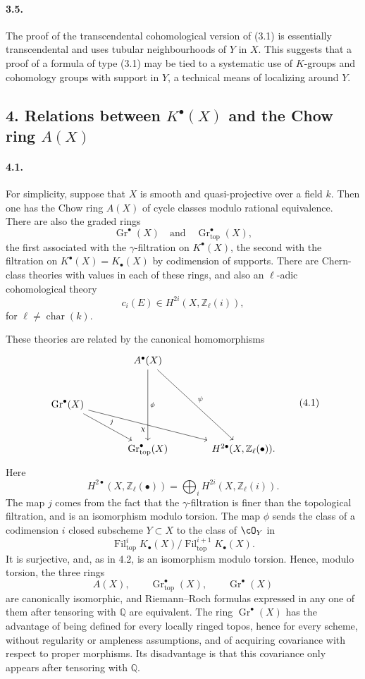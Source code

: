 \documentclass[11pt]{article}
\theoremstyle{plain}
\theoremstyle{definition}
\theoremstyle{remark}
\newcommand{\QQ}{\mathbb Q}
\newcommand{\ZZ}{\mathbb Z}
\DeclareMathOperator{\Gr}{Gr}
\providecommand{\Fil}{\operatorname{Fil}}
\providecommand{\car}{\operatorname{char}}
\providecommand{\topf}{\mathrm{top}}
\begin{document}
\paragraph{3.5.}
The proof of the transcendental cohomological version of (3.1) is essentially transcendental and uses tubular neighbourhoods of $Y$ in $X$. This suggests that a proof of a formula of type (3.1) may be tied to a systematic use of $K$-groups and cohomology groups with support in $Y$, a technical means of localizing around $Y$.

\subsection*{4. Relations between $K^\bullet(X)$ and the Chow ring $A(X)$}

\paragraph{4.1.}
For simplicity, suppose that $X$ is smooth and quasi-projective over a field $k$. Then one has the Chow ring $A(X)$ of cycle classes modulo rational equivalence. There are also the graded rings
\[
\Gr^\bullet(X)
\quad\text{and}\quad
\Gr^\bullet_{\topf}(X),
\]
the first associated with the $\gamma$-filtration on $K^\bullet(X)$, the second with the filtration on $K^\bullet(X)=K_\bullet(X)$ by codimension of supports. There are Chern-class theories with values in each of these rings, and also an $\ell$-adic cohomological theory
\[
c_i(E)\in H^{2i}(X,\ZZ_\ell(i)),
\]
for $\ell\neq\car(k)$.

These theories are related by the canonical homomorphisms
\[
\begin{tikzcd}[column sep=large,row sep=large]
& A^\bullet(X)\arrow[dd,"\phi"]\arrow[rdd,"\psi"] &\\
\Gr^\bullet(X)\arrow[rd,"j"]\arrow[rrd,"\chi"'] &&\\
& \Gr^\bullet_{\topf}(X) & H^{2\bullet}(X,\ZZ_\ell(\bullet)).
\end{tikzcd}
\tag{4.1}
\]
Here
\[
H^{2\bullet}(X,\ZZ_\ell(\bullet))=\bigoplus_i H^{2i}(X,\ZZ_\ell(i)).
\]
The map $j$ comes from the fact that the $\gamma$-filtration is finer than the topological filtration, and is an isomorphism modulo torsion. The map $\phi$ sends the class of a codimension $i$ closed subscheme $Y\subset X$ to the class of $\cO_Y$ in
\[
\Fil^i_{\topf}K_\bullet(X)/\Fil^{i+1}_{\topf}K_\bullet(X).
\]
It is surjective, and, as in 4.2, is an isomorphism modulo torsion. Hence, modulo torsion, the three rings
\[
A(X),\qquad \Gr^\bullet_{\topf}(X),\qquad \Gr^\bullet(X)
\]
are canonically isomorphic, and Riemann--Roch formulas expressed in any one of them after tensoring with $\QQ$ are equivalent. The ring $\Gr^\bullet(X)$ has the advantage of being defined for every locally ringed topos, hence for every scheme, without regularity or ampleness assumptions, and of acquiring covariance with respect to proper morphisms. Its disadvantage is that this covariance only appears after tensoring with $\QQ$.
\end{document}
